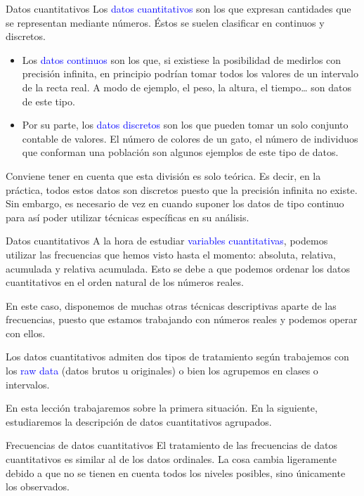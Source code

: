 \documentclass[
  ignorenonframetext,
]{beamer}
\newcommand\blue[1]{\textcolor{blue}{#1}}
\begin{document}
\begin{frame}{Datos cuantitativos}
\label{datos-cuantitativos}
Los \blue{datos cuantitativos} son los que expresan cantidades que se
representan mediante números. Éstos se suelen clasificar en continuos y
discretos.

\begin{itemize}
\item
  Los \blue{datos continuos} son los que, si existiese la posibilidad de
  medirlos con precisión infinita, en principio podrían tomar todos los
  valores de un intervalo de la recta real. A modo de ejemplo, el peso,
  la altura, el tiempo\ldots{} son datos de este tipo.
\item
  Por su parte, los \blue{datos discretos} son los que pueden tomar un
  solo conjunto contable de valores. El número de colores de un gato, el
  número de individuos que conforman una población son algunos ejemplos
  de este tipo de datos.
\end{itemize}

Conviene tener en cuenta que esta división es solo teórica. Es decir, en
la práctica, todos estos datos son discretos puesto que la precisión
infinita no existe. Sin embargo, es necesario de vez en cuando suponer
los datos de tipo continuo para así poder utilizar técnicas específicas
en su análisis.
\end{frame}

\begin{frame}{Datos cuantitativos}
\label{datos-cuantitativos-1}
A la hora de estudiar \blue{variables cuantitativas}, podemos utilizar
las frecuencias que hemos visto hasta el momento: absoluta, relativa,
acumulada y relativa acumulada. Esto se debe a que podemos ordenar los
datos cuantitativos en el orden natural de los números reales.

En este caso, disponemos de muchas otras técnicas descriptivas aparte de
las frecuencias, puesto que estamos trabajando con números reales y
podemos operar con ellos.

Los datos cuantitativos admiten dos tipos de tratamiento según
trabajemos con los \blue{raw data} (datos brutos u originales) o bien
los agrupemos en clases o intervalos.

En esta lección trabajaremos sobre la primera situación. En la
siguiente, estudiaremos la descripción de datos cuantitativos agrupados.
\end{frame}

\begin{frame}{Frecuencias de datos cuantitativos}
\label{frecuencias-de-datos-cuantitativos}
El tratamiento de las frecuencias de datos cuantitativos es similar al
de los datos ordinales. La cosa cambia ligeramente debido a que no se
tienen en cuenta todos los niveles posibles, sino únicamente los
observados.
\end{frame}
\end{document}
